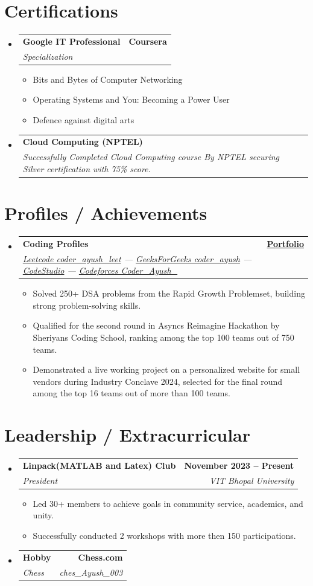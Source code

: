 \documentclass[letterpaper,10.9pt]{article}
\makeatletter
\newcommand{\resumeItem}[1]{
  \item\small{
    {#1 \vspace{-2pt}}
  }
}
\newcommand{\resumeSubheading}[4]{
  \vspace{-2pt}\item
    \begin{tabular*}{1.0\textwidth}[t]{l@{\extracolsep{\fill}}r}
      \textbf{#1} & \textbf{\small #2} \\
      \textit{\small#3} & \textit{\small #4} \\
    \end{tabular*}\vspace{-7pt}
}
\newcommand{\resumeSubHeadingListStart}{\begin{itemize}[leftmargin=0.0in, label={}]}
\newcommand{\resumeSubHeadingListEnd}{\end{itemize}}
\newcommand{\resumeItemListStart}{\begin{itemize}}
\newcommand{\resumeItemListEnd}{\end{itemize}\vspace{-7pt}}
\makeatother
\begin{document}
\section{Certifications}
    \resumeSubHeadingListStart
        \resumeSubheading{Google IT Professional}{Coursera}{Specialization}{}
            \resumeItemListStart
                \resumeItem{Bits and Bytes of Computer Networking}
                \resumeItem{Operating Systems and You: Becoming a Power User}
                \resumeItem{Defence against digital arts}
            \resumeItemListEnd
            \resumeSubheading{Cloud Computing (NPTEL)}{}{Successfully Completed Cloud Computing course By NPTEL securing Silver certification with 75\% score.}{}
    \resumeSubHeadingListEnd
    \vspace{-11pt}
\section{Profiles / Achievements}
    \resumeSubHeadingListStart
        \resumeSubheading{Coding Profiles}{{\href{https://ayushpandey003.vercel.app}{Portfolio}}}{\href{https://leetcode.com/u/coder_ayush_leet/}{Leetcode coder\_ayush\_leet} — \href{https://www.geeksforgeeks.org/user/coder_ayush/}{GeeksForGeeks coder\_ayush} — \href{https://www.naukri.com/code360/profile/6acdb891-7900-4c53-bbb9-83c31775ff08}{CodeStudio} — \href{https://codeforces.com/profile/Coder_Ayush_}{Codeforces Coder\_Ayush\_}}{}
            \resumeItemListStart
                \resumeItem{Solved 250+ DSA problems from the Rapid Growth Problemset, building strong problem-solving skills.}
                \resumeItem{Qualified for the second round in Asyncs Reimagine Hackathon by Sheriyans Coding School, ranking among the top 100 teams out of 750 teams.}
                \resumeItem{Demonstrated a live working project on a personalized website for small vendors during Industry Conclave 2024, selected for the final round among the top 16 teams out of more than 100 teams.}
            \resumeItemListEnd
    \resumeSubHeadingListEnd
\vspace{-12pt}
\section{Leadership / Extracurricular}
    \resumeSubHeadingListStart
        \resumeSubheading{Linpack(MATLAB and Latex) Club}{November 2023 -- Present}{President}{VIT Bhopal University}
            \resumeItemListStart
                \resumeItem{Led 30+ members to achieve goals in community service, academics, and unity.}
                \resumeItem{Successfully conducted 2 workshops with more then 150 participations.}
            \resumeItemListEnd
             \resumeSubheading{Hobby}{Chess.com}{Chess}{ches\_Ayush\_003}
            
    \resumeSubHeadingListEnd
   
\end{document}
